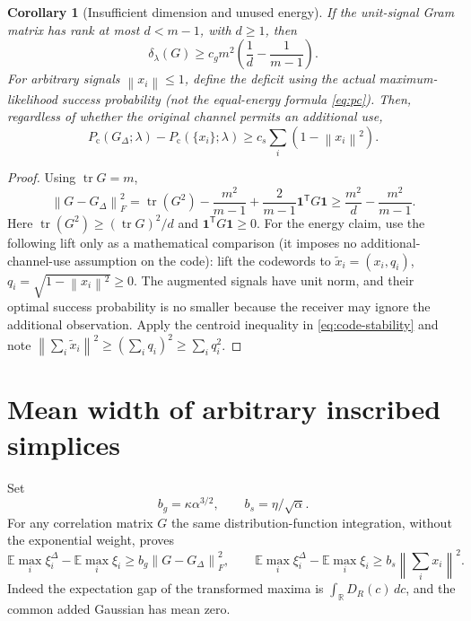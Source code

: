 \documentclass[11pt]{article}
\newtheorem{corollary}[theorem]{Corollary}
\theoremstyle{remark}\newtheorem{remark}[theorem]{Remark}
\newcommand{\R}{\mathbb R}
\newcommand{\E}{\mathbb E}
\newcommand{\one}{\mathbf 1}
\newcommand{\tr}{\operatorname{tr}}
\newcommand{\norm}[1]{\left\lVert#1\right\rVert}
\newcommand{\Pc}{P_{\mathrm c}}
\begin{document}
\begin{corollary}[Insufficient dimension and unused energy]\label{cor:operational}
If the unit-signal Gram matrix has rank at most $d<m-1$, with $d\ge1$, then
\begin{equation}\label{eq:rank}
 \delta_\lambda(G)\ge c_gm^2\left(\frac1d-\frac1{m-1}\right).
\end{equation}
For arbitrary signals $\norm{x_i}\le1$, define the deficit using the actual
maximum-likelihood success probability (not the equal-energy formula
\eqref{eq:pc}). Then, regardless of whether the original channel permits an additional
use,
\begin{equation}\label{eq:slack}
 \Pc(G_\Delta;\lambda)-\Pc(\{x_i\};\lambda)
 \ge c_s\sum_i(1-\norm{x_i}^2).
\end{equation}
\end{corollary}
\begin{proof}
Using $\tr G=m$,
\[
 \norm{G-G_\Delta}_F^2
 =\tr(G^2)-\frac{m^2}{m-1}+\frac{2}{m-1}\one^{\mathsf T}G\one
 \ge\frac{m^2}{d}-\frac{m^2}{m-1}.
\]
Here $\tr(G^2)\ge(\tr G)^2/d$ and $\one^{\mathsf T}G\one\ge0$.
For the energy claim, use the following lift only as a mathematical
comparison (it imposes no additional-channel-use assumption on the code):
lift the codewords to
$\widetilde x_i=(x_i,q_i)$, $q_i=\sqrt{1-\norm{x_i}^2}\ge0$.
The augmented signals have unit norm, and their optimal success probability
is no smaller because the receiver may ignore the additional observation.
Apply the centroid inequality in \eqref{eq:code-stability} and note
$\norm{\sum_i\widetilde x_i}^2\ge(\sum_iq_i)^2\ge\sum_iq_i^2$.
\end{proof}

\section{Mean width of arbitrary inscribed simplices}
Set
\begin{equation}\label{eq:meanconstants}
 b_g=\kappa\alpha^{3/2},\qquad b_s=\eta/\sqrt\alpha.
\end{equation}
For any correlation matrix $G$ the same distribution-function integration,
without the exponential weight, proves
\begin{equation}\label{eq:mean-unit}
 \E\max_i\xi_i^\Delta-\E\max_i\xi_i
 \ge b_g\norm{G-G_\Delta}_F^2,\qquad
 \E\max_i\xi_i^\Delta-\E\max_i\xi_i
 \ge b_s\norm{\textstyle\sum_i x_i}^2.
\end{equation}
Indeed the expectation gap of the transformed maxima is
$\int_\R D_R(c)\,dc$, and the common added Gaussian has mean zero.
\end{document}

